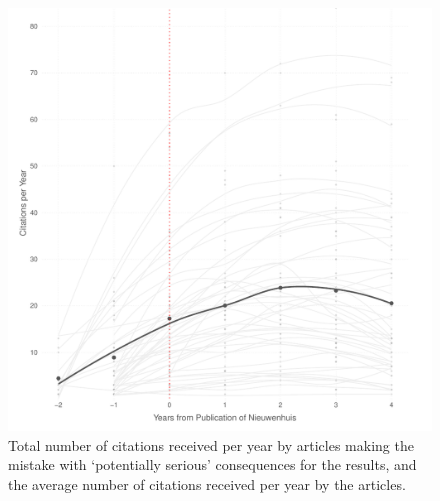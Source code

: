 \documentclass[12pt, letterpaper]{article}
\begin{document}
\clearpage
\begin{figure}[H]
\centering
\includegraphics[scale=.7]{../figs/serious_nw_growth_curve.pdf}
\caption{Total number of citations received per year by articles making the mistake with `potentially serious' consequences for the results, and the average number of citations received per year by the articles.}
\label{fig:serious_niewenhuis}
\end{figure}

\clearpage


\clearpage


\clearpage

\end{document}
